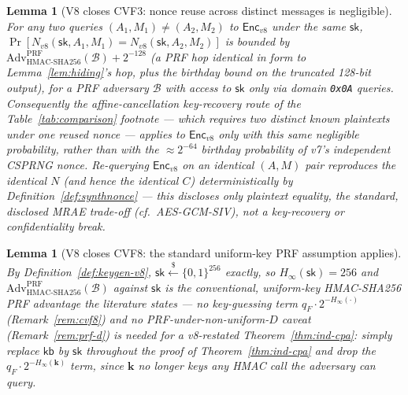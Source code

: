 \documentclass[11pt,a4paper]{article}
\newtheorem{lemma}[theorem]{Lemma}
\begin{document}
\begin{lemma}[V8 closes CVF3: nonce reuse across distinct messages is negligible]
\label{lem:v8-cvf3}
For any two queries $(A_1,M_1) \neq (A_2,M_2)$ to $\mathsf{Enc}_{v8}$
under the same $\mathsf{sk}$, $\Pr[N_{v8}(\mathsf{sk},A_1,M_1) =
N_{v8}(\mathsf{sk},A_2,M_2)]$ is bounded by
$\mathrm{Adv}^{\mathrm{PRF}}_{\mathrm{HMAC\text{-}SHA256}}(\mathcal{B}) +
2^{-128}$ (a PRF hop identical in form to Lemma~\ref{lem:hiding}'s hop,
plus the birthday bound on the truncated 128-bit output), for a PRF
adversary $\mathcal{B}$ with access to $\mathsf{sk}$ only via domain
\texttt{0x0A} queries. Consequently the affine-cancellation key-recovery
route of the Table~\ref{tab:comparison} footnote --- which requires two
\emph{distinct} known plaintexts under one \emph{reused} nonce --- applies
to $\mathsf{Enc}_{v8}$ only with this same negligible probability, rather
than with the $\approx 2^{-64}$ birthday probability of v7's independent
CSPRNG nonce. Re-querying $\mathsf{Enc}_{v8}$ on an \emph{identical}
$(A,M)$ pair reproduces the identical $N$ (and hence the identical $C$)
deterministically by Definition~\ref{def:synthnonce} --- this discloses
only plaintext equality, the standard, disclosed MRAE trade-off (cf.\
AES-GCM-SIV), not a key-recovery or confidentiality break.
\end{lemma}

\begin{lemma}[V8 closes CVF8: the standard uniform-key PRF assumption applies]
\label{lem:v8-cvf8}
By Definition~\ref{def:keygen-v8}, $\mathsf{sk}\xleftarrow{\$}\{0,1\}^{256}$
exactly, so $H_\infty(\mathsf{sk})=256$ and
$\mathrm{Adv}^{\mathrm{PRF}}_{\mathrm{HMAC\text{-}SHA256}}(\mathcal{B})$
against $\mathsf{sk}$ is the conventional, uniform-key HMAC-SHA256 PRF
advantage the literature states --- no key-guessing term
$q_F\cdot2^{-H_\infty(\cdot)}$ (Remark~\ref{rem:cvf8}) and no
PRF-under-non-uniform-$D$ caveat (Remark~\ref{rem:prf-d}) is needed for a
v8-restated Theorem~\ref{thm:ind-cpa}: simply replace $\mathsf{kb}$ by
$\mathsf{sk}$ throughout the proof of Theorem~\ref{thm:ind-cpa} and drop
the $q_F\cdot2^{-H_\infty(\mathbf{k})}$ term, since $\mathbf{k}$ no longer
keys any HMAC call the adversary can query.
\end{lemma}
\end{document}
